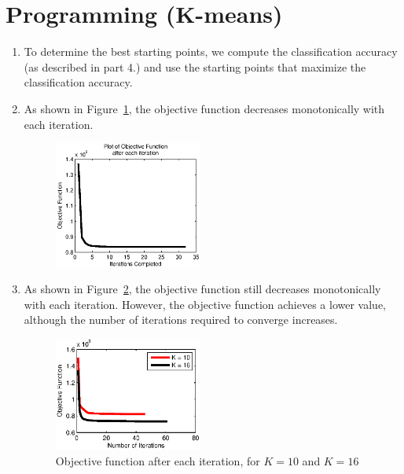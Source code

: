 \documentclass[11pt]{article}
\begin{document}
\section{Programming (K-means)}
\begin{enumerate}
\item To determine the best starting points, we compute the classification
accuracy (as described in part 4.) and use the starting points that maximize
the classification accuracy.

\item As shown in Figure~\ref{fig:4.2}, the objective function decreases
monotonically with each iteration.
\begin{figure}[h]
\caption{}
\begin{center}
\includegraphics[width=0.46\textwidth]{4.2.eps}
\end{center}
\label{fig:4.2}
\end{figure}

\item As shown in Figure~\ref{fig:4.3}, the objective function still decreases
monotonically with each iteration. However, the objective function achieves a
lower value, although the number of iterations required to converge increases.
\begin{figure}[h]
\caption{Objective function after each iteration, for $K = 10$ and $K = 16$}
\begin{center}
\includegraphics[width=0.46\textwidth]{4.3.eps}
\end{center}
\label{fig:4.3}
\end{figure}


\end{enumerate}
\end{document}
